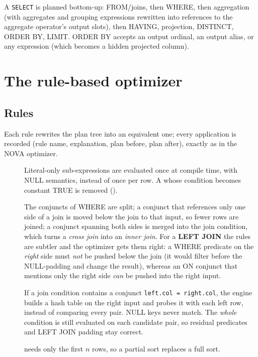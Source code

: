 A \texttt{SELECT} is planned bottom-up: FROM/joins, then WHERE, then aggregation (with aggregates and grouping expressions rewritten into references to the aggregate operator's output slots), then HAVING, projection, DISTINCT, ORDER BY, LIMIT. ORDER BY accepts an output ordinal, an output alias, or any expression (which becomes a hidden projected column).

\section{The rule-based optimizer}
\subsection{Rules}
Each rule rewrites the plan tree into an equivalent one; every application is recorded (rule name, explanation, plan before, plan after), exactly as in the NOVA optimizer.

\begin{description}
  \item[] Literal-only sub-expressions are evaluated once at compile time, with NULL semantics, instead of once per row. A  whose condition becomes constant TRUE is removed ().
  \item[] The conjuncts of WHERE are split; a conjunct that references only one side of a join is moved below the join to that input, so fewer rows are joined; a conjunct spanning both sides is merged into the join condition, which turns a \emph{cross join} into an \emph{inner join}. For a \textbf{LEFT JOIN} the rules are subtler and the optimizer gets them right: a WHERE predicate on the \emph{right} side must \emph{not} be pushed below the join (it would filter before the NULL-padding and change the result), whereas an ON conjunct that mentions only the right side \emph{can} be pushed into the right input.
  \item[] If a join condition contains a conjunct \verb|left.col = right.col|, the engine builds a hash table on the right input and probes it with each left row, instead of comparing every pair. NULL keys never match. The \emph{whole} condition is still evaluated on each candidate pair, so residual predicates and LEFT JOIN padding stay correct.
  \item[]  needs only the first $n$ rows, so a partial sort replaces a full sort.
\end{description}

